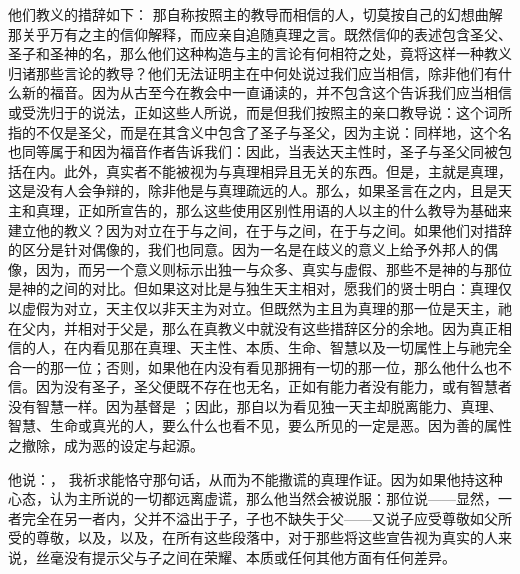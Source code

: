 他们教义的措辞如下： 那自称按照主的教导而相信的人，切莫按自己的幻想曲解那关乎万有之主的信仰解释，而应亲自追随真理之言。既然信仰的表述包含圣父、圣子和圣神的名，那么他们这种构造与主的言论有何相符之处，竟将这样一种教义归诸那些言论的教导？他们无法证明主在中何处说过我们应当相信，除非他们有什么新的福音。因为从古至今在教会中一直诵读的，并不包含这个告诉我们应当相信或受洗归于的说法，正如这些人所说，而是但我们按照主的亲口教导说：这个词所指的不仅是圣父，而是在其含义中包含了圣子与圣父，因为主说：同样地，这个名也同等属于和因为福音作者告诉我们：因此，当表达天主性时，圣子与圣父同被包括在内。此外，真实者不能被视为与真理相异且无关的东西。但是，主就是真理，这是没有人会争辩的，除非他是与真理疏远的人。那么，如果圣言在之内，且是天主和真理，正如所宣告的，那么这些使用区别性用语的人以主的什么教导为基础来建立他的教义？因为对立在于与之间，在于与之间，在于与之间。如果他们对措辞的区分是针对偶像的，我们也同意。因为一名是在歧义的意义上给予外邦人的偶像，因为，而另一个意义则标示出独一与众多、真实与虚假、那些不是神的与那位是神的之间的对比。但如果这对比是与独生天主相对，愿我们的贤士明白：真理仅以虚假为对立，天主仅以非天主为对立。但既然为主且为真理的那一位是天主，祂在父内，并相对于父是，那么在真教义中就没有这些措辞区分的余地。因为真正相信的人，在内看见那在真理、天主性、本质、生命、智慧以及一切属性上与祂完全合一的那一位；否则，如果他在内没有看见那拥有一切的那一位，那么他什么也不信。因为没有圣子，圣父便既不存在也无名，正如有能力者没有能力，或有智慧者没有智慧一样。因为基督是 ；因此，那自以为看见独一天主却脱离能力、真理、智慧、生命或真光的人，要么什么也看不见，要么所见的一定是恶。因为善的属性之撤除，成为恶的设定与起源。\par

他说：， 我祈求能恪守那句话，从而为不能撒谎的真理作证。因为如果他持这种心态，认为主所说的一切都远离虚谎，那么他当然会被说服：那位说——显然，一者完全在另一者内，父并不溢出于子，子也不缺失于父——又说子应受尊敬如父所受的尊敬，以及，以及，在所有这些段落中，对于那些将这些宣告视为真实的人来说，丝毫没有提示父与子之间在荣耀、本质或任何其他方面有任何差异。\par

